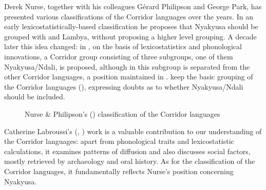Derek Nurse, together with his colleagues Gérard Philipson and George Park, has presented various classifications of the Corridor languages over the years. In an early lexicostatistically-based classification \citep{NurseD1979} he proposes that Nyakyusa should be grouped with  and Lambya, without proposing a higher level grouping. A decade later this idea changed: in \citet{NurseD1988}, on the basis of lexicostatistics and phonological innovations, a Corridor group consisting of three subgroups, one of them Nyakyusa/Ndali, is proposed, although in \citet{NurseDParkG1988} this subgroup is separated from the other Corridor languages, a position maintained in \citet{NurseD1999}. \citet{NurseDPhillipsonG2003b} keep the basic grouping of the Corridor languages (), expressing doubts as to whether Nyakyusa/Ndali should be included.

\begin{figure}
\begin{center}
\caption{Nurse \& Philipson's (\citeyear{NurseDPhillipsonG2003b}) classification of the Corridor languages}\label{ClassificationNursePhillipson2003}
\end{center}
\end{figure} 
Catherine Labroussi's (\citeyear{LabroussiC1998}, \citeyear{LabroussiC1999}) work is a valuable contribution to our understanding of the Corridor languages: apart from phonological traits and lexicostatistic calculations, it examines patterns of diffusion and also discusses social factors, mostly retrieved by archaeology and oral history. As for the classification of the Corridor languages, it fundamentally reflects Nurse's position concerning Nyakyusa.

